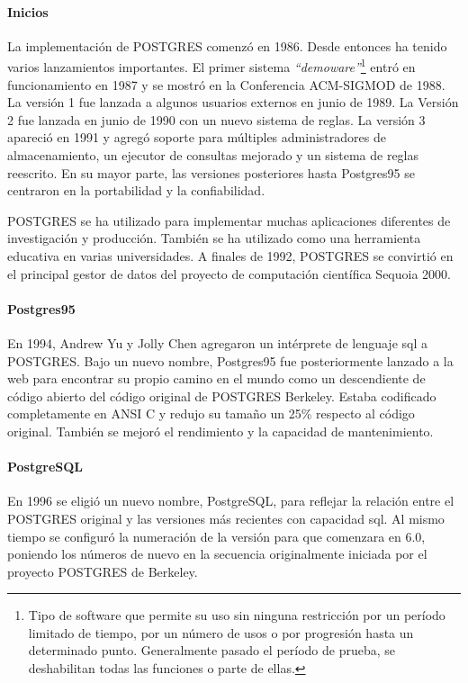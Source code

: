 {\paragraph{Inicios}
La implementación de POSTGRES comenzó en 1986. Desde entonces ha tenido varios lanzamientos importantes. El primer sistema \emph{``demoware''}\footnote{Tipo de software que permite su uso sin ninguna restricción por un período limitado de tiempo, por un número de usos o por progresión hasta un determinado punto. Generalmente pasado el período de prueba, se deshabilitan todas las funciones o parte de ellas.} entró en funcionamiento en 1987 y se mostró en la Conferencia ACM-SIGMOD de 1988. La versión 1 fue lanzada a algunos usuarios externos en junio de 1989. La Versión 2 fue lanzada en junio de 1990 con un nuevo sistema de reglas. La versión 3 apareció en 1991 y agregó soporte para múltiples administradores de almacenamiento, un ejecutor de consultas mejorado y un sistema de reglas reescrito. En su mayor parte, las versiones posteriores hasta Postgres95 se centraron en la portabilidad y la confiabilidad.

POSTGRES se ha utilizado para implementar muchas aplicaciones diferentes de investigación y producción. También se ha utilizado como una herramienta educativa en varias universidades. A finales de 1992, POSTGRES se convirtió en el principal gestor de datos del proyecto de computación científica Sequoia 2000.

\paragraph{Postgres95}
En 1994, Andrew Yu y Jolly Chen agregaron un intérprete de lenguaje \acrshort{sql} a POSTGRES. Bajo un nuevo nombre, Postgres95 fue posteriormente lanzado a la web para encontrar su propio camino en el mundo como un descendiente de código abierto del código original de POSTGRES Berkeley. Estaba codificado completamente en ANSI C y redujo su tamaño un 25\% respecto al código original. También se mejoró el rendimiento y la capacidad de mantenimiento.

\paragraph{PostgreSQL}
En 1996 se eligió un nuevo nombre, PostgreSQL, para reflejar la relación entre el POSTGRES original y las versiones más recientes con capacidad \acrshort{sql}. Al mismo tiempo se configuró la numeración de la versión para que comenzara en 6.0, poniendo los números de nuevo en la secuencia originalmente iniciada por el proyecto POSTGRES de Berkeley.

}
